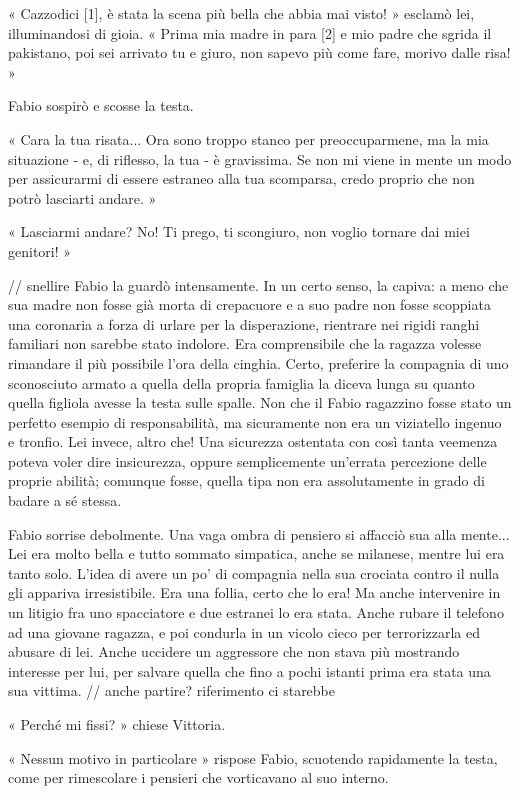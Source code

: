 « Cazzodici [1], è stata la scena più bella che abbia mai visto! » esclamò lei, illuminandosi di gioia. « Prima mia madre in para [2] e mio padre che sgrida il pakistano, poi sei arrivato tu e giuro, non sapevo più come fare, morivo dalle risa! »

Fabio sospirò e scosse la testa.

« Cara la tua risata... Ora sono troppo stanco per preoccuparmene, ma la mia situazione - e, di riflesso, la tua - è gravissima. Se non mi viene in mente un modo per assicurarmi di essere estraneo alla tua scomparsa, credo proprio che non potrò lasciarti andare. »

« Lasciarmi andare? No! Ti prego, ti scongiuro, non voglio tornare dai miei genitori! »

// snellire
Fabio la guardò intensamente. In un certo senso, la capiva: a meno che sua madre non fosse già morta di crepacuore e a suo padre non fosse scoppiata una coronaria a forza di urlare per la disperazione, rientrare nei rigidi ranghi familiari non sarebbe stato indolore. Era comprensibile che la ragazza volesse rimandare il più possibile l'ora della cinghia. Certo, preferire la compagnia di uno sconosciuto armato a quella della propria famiglia la diceva lunga su quanto quella figliola avesse la testa sulle spalle. Non che il Fabio ragazzino fosse stato un perfetto esempio di responsabilità, ma sicuramente non era un viziatello ingenuo e tronfio. Lei invece, altro che! Una sicurezza ostentata con così tanta veemenza poteva voler dire insicurezza, oppure semplicemente un'errata percezione delle proprie abilità; comunque fosse, quella tipa non era assolutamente in grado di badare a sé stessa.

Fabio sorrise debolmente. Una vaga ombra di pensiero si affacciò sua alla mente... Lei era molto bella e tutto sommato simpatica, anche se milanese, mentre lui era tanto solo. L'idea di avere un po' di compagnia nella sua crociata contro il nulla gli appariva irresistibile. Era una follia, certo che lo era! Ma anche intervenire in un litigio fra uno spacciatore e due estranei lo era stata. Anche rubare il telefono ad una giovane ragazza, e poi condurla in un vicolo cieco per terrorizzarla ed abusare di lei. Anche uccidere un aggressore che non stava più mostrando interesse per lui, per salvare quella che fino a pochi istanti prima era stata una sua vittima. // anche partire? riferimento ci starebbe

« Perché mi fissi? » chiese Vittoria.

« Nessun motivo in particolare » rispose Fabio, scuotendo rapidamente la testa, come per rimescolare i pensieri che vorticavano al suo interno.

